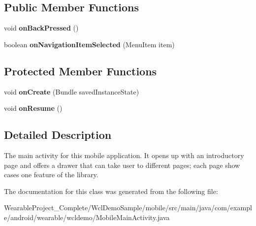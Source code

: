 \subsection*{Public Member Functions}
\begin{DoxyCompactItemize}
\item 
void {\bfseries on\+Back\+Pressed} ()\hypertarget{classcom_1_1example_1_1android_1_1wearable_1_1wcldemo_1_1MobileMainActivity_a8b27249e3dba3c64f639ba3082de50df}{}\label{classcom_1_1example_1_1android_1_1wearable_1_1wcldemo_1_1MobileMainActivity_a8b27249e3dba3c64f639ba3082de50df}

\item 
boolean {\bfseries on\+Navigation\+Item\+Selected} (Menu\+Item item)\hypertarget{classcom_1_1example_1_1android_1_1wearable_1_1wcldemo_1_1MobileMainActivity_aee800af484d3413d42325c2e3cb97235}{}\label{classcom_1_1example_1_1android_1_1wearable_1_1wcldemo_1_1MobileMainActivity_aee800af484d3413d42325c2e3cb97235}

\end{DoxyCompactItemize}
\subsection*{Protected Member Functions}
\begin{DoxyCompactItemize}
\item 
void {\bfseries on\+Create} (Bundle saved\+Instance\+State)\hypertarget{classcom_1_1example_1_1android_1_1wearable_1_1wcldemo_1_1MobileMainActivity_a1abbdd57712851fd3cfd56780e1c01bd}{}\label{classcom_1_1example_1_1android_1_1wearable_1_1wcldemo_1_1MobileMainActivity_a1abbdd57712851fd3cfd56780e1c01bd}

\item 
void {\bfseries on\+Resume} ()\hypertarget{classcom_1_1example_1_1android_1_1wearable_1_1wcldemo_1_1MobileMainActivity_ae0fbee5dfe0e316a8f43fd7b165c72dd}{}\label{classcom_1_1example_1_1android_1_1wearable_1_1wcldemo_1_1MobileMainActivity_ae0fbee5dfe0e316a8f43fd7b165c72dd}

\end{DoxyCompactItemize}


\subsection{Detailed Description}
The main activity for this mobile application. It opens up with an introductory page and offers a drawer that can take user to different pages; each page show cases one feature of the library. 

The documentation for this class was generated from the following file\+:\begin{DoxyCompactItemize}
\item 
Wearable\+Project\+\_\+\+Complete/\+Wcl\+Demo\+Sample/mobile/src/main/java/com/example/android/wearable/wcldemo/Mobile\+Main\+Activity.\+java\end{DoxyCompactItemize}
